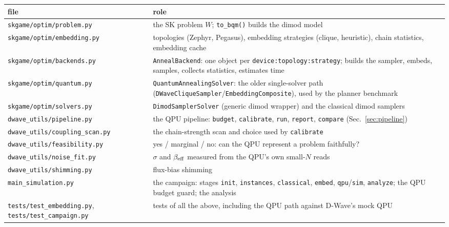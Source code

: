 \documentclass[11pt,a4paper]{article}
\newcommand{\code}[1]{\nolinkurl{#1}}
\begin{document}
\begin{table}[H]\centering\small
\begin{tabularx}{\linewidth}{L{5.0cm}X}
\toprule
file & role \\ \midrule
\code{skgame/optim/problem.py} & the SK problem $W$; \code{to_bqm()} builds the dimod model \\
\code{skgame/optim/embedding.py} & topologies (Zephyr, Pegasus), embedding strategies (clique, heuristic), chain statistics, embedding cache \\
\code{skgame/optim/backends.py} & \code{AnnealBackend}: one object per \code{device:topology:strategy}; builds the sampler, embeds, samples, collects statistics, estimates time \\
\code{skgame/optim/quantum.py} & \code{QuantumAnnealingSolver}: the older single-solver path (\code{DWaveCliqueSampler}/\code{EmbeddingComposite}), used by the planner benchmark \\
\code{skgame/optim/solvers.py} & \code{DimodSamplerSolver} (generic dimod wrapper) and the classical dimod samplers \\
\code{dwave_utils/pipeline.py} & the QPU pipeline: \code{budget}, \code{calibrate}, \code{run}, \code{report}, \code{compare} (Sec.~\ref{sec:pipeline}) \\
\code{dwave_utils/coupling_scan.py} & the chain-strength scan and choice used by \code{calibrate} \\
\code{dwave_utils/feasibility.py} & yes / marginal / no: can the QPU represent a problem faithfully? \\
\code{dwave_utils/noise_fit.py} & $\sigma$ and $\beta_{\rm eff}$ measured from the QPU's own small-$N$ reads \\
\code{dwave_utils/shimming.py} & flux-bias shimming \\
\code{main_simulation.py} & the campaign: stages \code{init}, \code{instances}, \code{classical}, \code{embed}, \code{qpu}/\code{sim}, \code{analyze}; the QPU budget guard; the analysis \\
\code{tests/test_embedding.py}, \code{tests/test_campaign.py} & tests of all the above, including the QPU path against D-Wave's mock QPU \\
\bottomrule
\end{tabularx}
\end{table}
\end{document}
